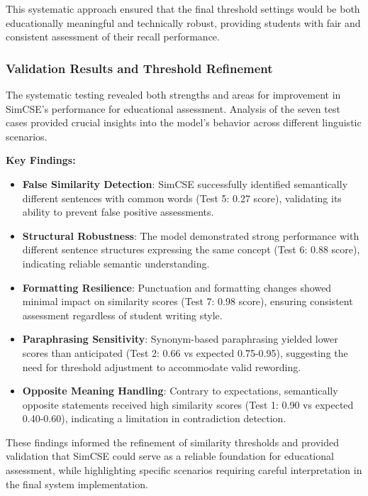 {This systematic approach ensured that the final threshold settings would be both educationally meaningful and technically robust, providing students with fair and consistent assessment of their recall performance.

\subsubsection{Validation Results and Threshold Refinement}

The systematic testing revealed both strengths and areas for improvement in SimCSE's performance for educational assessment. Analysis of the seven test cases provided crucial insights into the model's behavior across different linguistic scenarios.

\textbf{Key Findings:}
\begin{itemize}
    \item \textbf{False Similarity Detection}: SimCSE successfully identified semantically different sentences with common words (Test 5: 0.27 score), validating its ability to prevent false positive assessments.
    
    \item \textbf{Structural Robustness}: The model demonstrated strong performance with different sentence structures expressing the same concept (Test 6: 0.88 score), indicating reliable semantic understanding.
    
    \item \textbf{Formatting Resilience}: Punctuation and formatting changes showed minimal impact on similarity scores (Test 7: 0.98 score), ensuring consistent assessment regardless of student writing style.
    
    \item \textbf{Paraphrasing Sensitivity}: Synonym-based paraphrasing yielded lower scores than anticipated (Test 2: 0.66 vs expected 0.75-0.95), suggesting the need for threshold adjustment to accommodate valid rewording.
    
    \item \textbf{Opposite Meaning Handling}: Contrary to expectations, semantically opposite statements received high similarity scores (Test 1: 0.90 vs expected 0.40-0.60), indicating a limitation in contradiction detection.
\end{itemize}

These findings informed the refinement of similarity thresholds and provided validation that SimCSE could serve as a reliable foundation for educational assessment, while highlighting specific scenarios requiring careful interpretation in the final system implementation.
}

